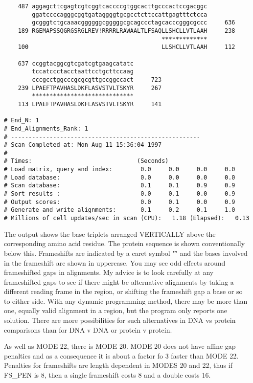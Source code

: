 \documentclass[12pt]{article}
\begin{document}
\begin{scriptsize}
\begin{verbatim}
    487 aggagcttcgagtcgtcggtcaccccgtggcacttgcccactccgacggc
        ggatccccagggcggtgataggggtgcgcctcttccattgagtttctcca
        gcgggtctgcaaacggggggcgggggcgcagccctagcacccgggcgccc     636
    189 RGEMAPSSQGRGSRGLREV!RRRRLRAWAALTLFSAQLLSHCLLVTLAAH     238
                                             *************
    100                                      LLSHCLLVTLAAH     112

    637 ccggtacggcgtcgatcgtgaagcatatc
        tccatccctacctaattcctgcttccaag
        cccgcctggcccgcgcgttgccggccact     723
    239 LPAEFTPAVHASLDKFLASVSTVLTSKYR     267
        *****************************
    113 LPAEFTPAVHASLDKFLASVSTVLTSKYR     141

# End_N: 1
# End_Alignments_Rank: 1
# ------------------------------------------------------
# Scan Completed at: Mon Aug 11 15:36:04 1997
# 
# Times:                              (Seconds)
# Load matrix, query and index:        0.0     0.0     0.0     0.0
# Load database:                       0.0     0.0     0.0     0.0
# Scan database:                       0.1     0.1     0.9     0.9
# Sort results :                       0.0     0.1     0.0     0.9
# Output scores:                       0.0     0.1     0.0     0.9
# Generate and write alignments:       0.1     0.2     0.1     1.0
# Millions of cell updates/sec in scan (CPU):   1.18 (Elapsed):   0.13
\end{verbatim}
\end{scriptsize}

The output shows the base triplets arranged VERTICALLY above the
corresponding amino acid residue.  The protein sequence is shown
conventionally below this.  Frameshifts  are indicated by a caret
symbol "\^" and the bases involved in the frameshift are shown in
uppercase.  You may see odd effects around frameshifted gaps in
alignments.  My advice is to look carefully at any frameshifted gaps
to see if there might be alternative alignments by taking a different
reading frame in the region, or shifting the frameshift gap a base or
so to either side.  With any dynamic programming method, there may be
more than one, equally valid alignment in a region, but the program
only reports one solution.  There are more possibilities for such
alternatives in DNA vs protein comparisons than for DNA v DNA or
protein v protein.

As well as MODE 22, there is MODE 20.  MODE 20 does not have affine
gap penalties and as a consequence it is about a factor fo 3 faster
than MODE 22.  Penalties for frameshifts are length dependent in MODES
20 and 22, thus if FS\_PEN is 8, then a single frameshift costs 8 and a
double costs 16.
\end{document}
